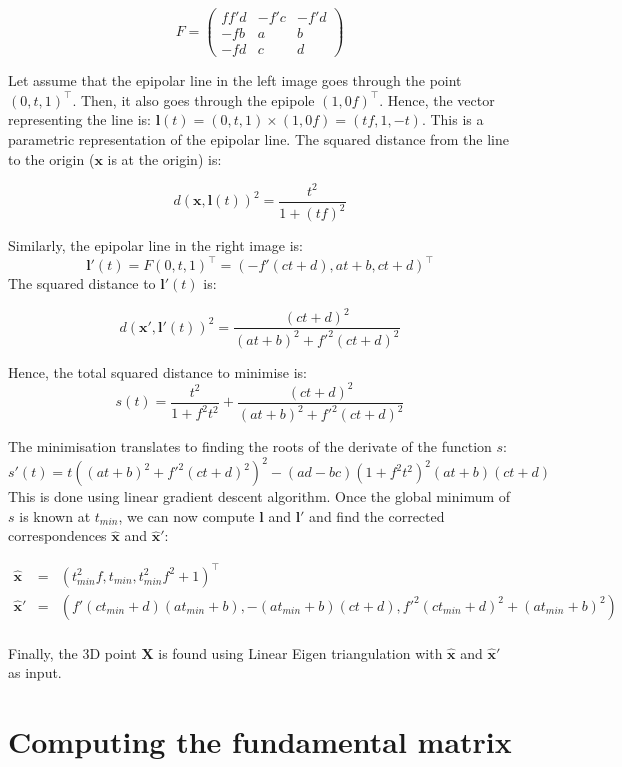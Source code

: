 \documentclass[11pt]{report}
\begin{document}
\[
F =
\left (
\begin{matrix}
	ff'd & -f'c & -f'd \\
	-fb & a & b \\
	-fd & c & d
\end{matrix}
\right )
\]

Let assume that the epipolar line in the left image goes through the point $(0, t, 1)^\top$. Then, it also goes through the epipole $(1, 0 f)^\top$. Hence, the vector representing the line is:  $\mathbf{l}(t) = (0, t, 1) \times (1, 0 f) = (tf, 1, -t)$. This is a parametric representation of the epipolar line. The squared distance from the line to the origin ($\mathbf{x}$ is at the origin) is:

\[
    d(\mathbf{x}, \mathbf{l}(t))^2 = \frac{t^2}{1+(tf)^2}
\]

Similarly, the epipolar line in the right image is:
\[
    \mathbf{l}'(t) = F(0, t, 1)^\top = (-f'(ct+d), at+b, ct+d)^\top
\]
The squared distance to $\mathbf{l}'(t)$ is:

\[
    d(\mathbf{x}', \mathbf{l}'(t))^2 = \frac{(ct+d)^2}{(at+b)^2+f'^2(ct+d)^2}
\]

Hence, the total squared distance to minimise is:
\[
    s(t) = \frac{t^2}{1+f^2t^2} + \frac{(ct+d)^2}{(at+b)^2+f'^2(ct+d)^2}
\]

The minimisation translates to finding the roots of the derivate of the function $s$: 
\[
    s'(t) = t((at+b)^2 + f'^2(ct+d)^2)^2 - (ad-bc)(1+f^2t^2)^2(at+b)(ct+d)
\]
This is done using linear gradient descent algorithm. Once the global minimum of $s$ is known at $t_{min}$, we can now compute $\mathbf{l}$ and $\mathbf{l}'$ and find the corrected correspondences $\hat{\mathbf{x}}$ and $\hat{\mathbf{x}}'$:

\[
\left .
  \begin{array}{ccl}
    \hat{\mathbf{x}} & = & (t_{min}^2f, t_{min}, t_{min}^2f^2+1)^\top \\
    \hat{\mathbf{x}}' & = & (f'(ct_{min}+d)(at_{min}+b), -(at_{min}+b)(ct+d), f'^2(ct_{min}+d)^2+(at_{min}+b)^2)\\
  \end{array}
\right .
\]

Finally, the 3D point $\mathbf{X}$ is found using Linear Eigen triangulation with $\hat{\mathbf{x}}$ and $\hat{\mathbf{x}}'$ as input. 

\section{Computing the fundamental matrix}
\end{document}
